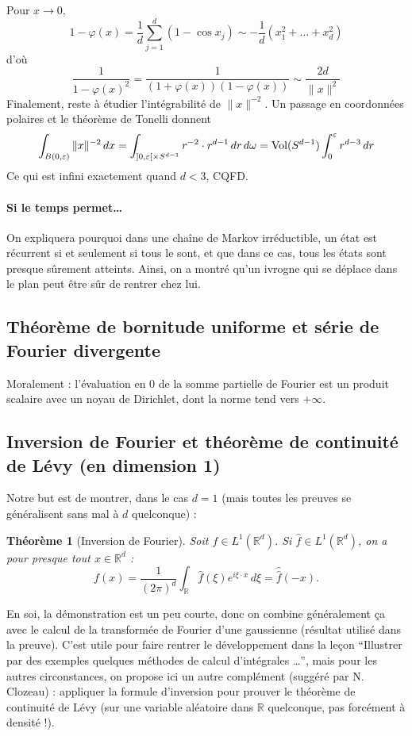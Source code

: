 \documentclass[a4paper, 11pt]{article}
\def\R{\mathbb{R}}
\newtheorem*{theorem}{Théorème}
\begin{document}
Pour $x \to 0$,
\[ 1 - \varphi(x) = \frac{1}{d} \sum_{j=1}^d (1 - \cos x_j) \sim
  -\frac{1}{d}(x_1^2 + \ldots + x_d^2) \] d'où
\[\frac{1}{1 - \varphi(x)^2} = \frac{1}{(1 + \varphi(x))(1 - \varphi(x))} \sim
  \frac{2d}{\|x\|^2} \]
Finalement, reste à étudier l'intégrabilité de $\|x\|^{-2}$. Un passage en
coordonnées polaires et le théorème de Tonelli donnent
\[ \int_{B(0,\varepsilon)} \|x\|^{-2}\,dx = \int_{]0,\varepsilon[ \times S^{d-1}}
  r^{-2} \cdot r^{d-1}\,dr\,d\omega = \textnormal{Vol}(S^{d-1}) \int_0^\varepsilon
  r^{d-3}\,dr \]
Ce qui est infini exactement quand $d < 3$, CQFD.

\paragraph{Si le temps permet…} On expliquera pourquoi dans une chaîne de Markov
irréductible, un état est récurrent si et seulement si tous le sont, et que dans
ce cas, tous les états sont presque sûrement atteints. Ainsi, on a montré qu'un
ivrogne qui se déplace dans le plan peut être sûr de rentrer chez lui.


\subsection{Théorème de bornitude uniforme et série de Fourier divergente}

Moralement : l'évaluation en 0 de la somme partielle de Fourier est un produit
scalaire avec un noyau de Dirichlet, dont la norme tend vers $+\infty$.

\subsection{Inversion de Fourier et théorème de continuité de Lévy (en dimension 1)}

Notre but est de montrer, dans le cas $d = 1$ (mais toutes les preuves se
généralisent sans mal à $d$ quelconque) :

\begin{theorem}[Inversion de Fourier]
  Soit $f \in L^1(\R^d)$. Si $\hat{f} \in L^1(\R^d)$, on a pour presque
  tout $x \in \R^d$ :
\[ f(x) = \frac{1}{(2\pi)^d} \int_\R \hat{f}(\xi) e^{i\xi \cdot x} \,d\xi =
  \hat{\hat{f}}(-x). \]
\end{theorem}

En soi, la démonstration est un peu courte, donc on combine généralement ça avec
le calcul de la transformée de Fourier d'une gaussienne (résultat utilisé dans
la preuve). C'est utile pour faire rentrer le développement dans la leçon
\enquote{Illustrer par des exemples quelques méthodes de calcul d'intégrales …},
mais pour les autres circonstances, on propose ici un autre complément (suggéré
par N. Clozeau) : appliquer la formule d'inversion pour prouver le théorème de
continuité de Lévy (sur une variable aléatoire dans $\R$ quelconque, pas
forcément à densité !).
\end{document}
